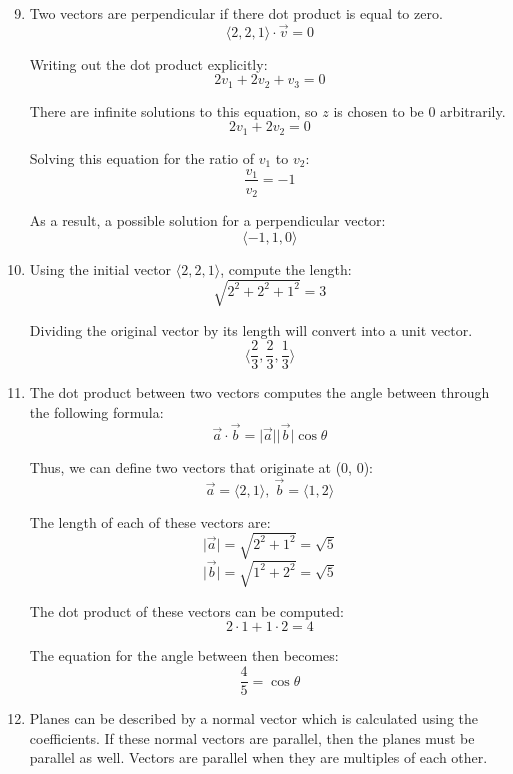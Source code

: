 \documentclass{article}
\begin{document}
\begin{enumerate}[1.]
  \setcounter{enumi}{8}
  \item Two vectors are perpendicular if there dot product is equal to zero.
    $$ \langle 2, 2, 1 \rangle \cdot \vec{v} = 0 $$

    Writing out the dot product explicitly:
    $$ 2 v_{1} + 2 v_{2} + v_{3} = 0 $$

    There are infinite solutions to this equation, so $z$ is chosen to be $0$
    arbitrarily.
    $$ 2 v_{1} + 2 v_{2} = 0 $$

    Solving this equation for the ratio of $v_{1}$ to $v_{2}$:
    $$ \frac{ v_{1} }{ v_{2} } = -1 $$

    As a result, a possible solution for a perpendicular vector:
    $$ \langle -1, 1, 0 \rangle $$

  \item Using the initial vector $\langle 2, 2, 1 \rangle$, compute the length:
    $$ \sqrt{2^{2} + 2^{2} + 1^{2}} = 3 $$

    Dividing the original vector by its length will convert into a unit vector.
    $$ \Big \langle \frac{ 2 }{ 3 }, \frac{ 2 }{ 3 }, \frac{ 1 }{ 3 } \Big \rangle $$

  \item The dot product between two vectors computes the angle between through
    the following formula:
    $$ \vec{a} \cdot \vec{b} = \vert \vec{a} \vert \vert \vec{b} \vert
    \cos \theta $$

    Thus, we can define two vectors that originate at (0, 0):
    $$ \vec{a} = \langle 2, 1 \rangle,\ \vec{b} = \langle 1, 2
    \rangle $$

    The length of each of these vectors are:
    $$ \vert \vec{a} \vert = \sqrt{2^{2} + 1^{2}} = \sqrt{5} $$
    $$ \vert \vec{b} \vert = \sqrt{1^{2} + 2^{2}} = \sqrt{5} $$

    The dot product of these vectors can be computed:
    $$ 2 \cdot 1 + 1 \cdot 2 = 4 $$

    The equation for the angle between then becomes:
    $$ \frac{ 4 }{ 5 } = \cos \theta $$

  \item Planes can be described by a normal vector which is calculated using the
    coefficients. If these normal vectors are parallel, then the planes must be
    parallel as well. Vectors are parallel when they are multiples of each
    other.

    \bigbreak


\end{enumerate}
\end{document}
